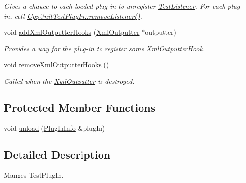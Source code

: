 \begin{DoxyCompactItemize}
\begin{DoxyCompactList}\small\item\em Gives a chance to each loaded plug-\/in to unregister \hyperlink{class_test_listener}{Test\-Listener}. For each plug-\/in, call \hyperlink{struct_cpp_unit_test_plug_in_a8f36157014b515d38efbc8ab67923d85}{Cpp\-Unit\-Test\-Plug\-In\-::remove\-Listener()}. \end{DoxyCompactList}\item 
\hypertarget{class_plug_in_manager_a4a9c64e0ac3f762b100b993d7e33f889}{void \hyperlink{class_plug_in_manager_a4a9c64e0ac3f762b100b993d7e33f889}{add\-Xml\-Outputter\-Hooks} (\hyperlink{class_xml_outputter}{Xml\-Outputter} $\ast$outputter)}\label{class_plug_in_manager_a4a9c64e0ac3f762b100b993d7e33f889}

\begin{DoxyCompactList}\small\item\em Provides a way for the plug-\/in to register some \hyperlink{class_xml_outputter_hook}{Xml\-Outputter\-Hook}. \end{DoxyCompactList}\item 
void \hyperlink{class_plug_in_manager_a0fe59f82fd430ea57159a6ffad9a4035}{remove\-Xml\-Outputter\-Hooks} ()
\begin{DoxyCompactList}\small\item\em Called when the \hyperlink{class_xml_outputter}{Xml\-Outputter} is destroyed. \end{DoxyCompactList}\end{DoxyCompactItemize}
\subsection*{Protected Member Functions}
\begin{DoxyCompactItemize}
\item 
void \hyperlink{class_plug_in_manager_afc1fa045afaac73cd44f69839056f1e1}{unload} (\hyperlink{struct_plug_in_manager_1_1_plug_in_info}{Plug\-In\-Info} \&plug\-In)
\end{DoxyCompactItemize}


\subsection{Detailed Description}
Manges Test\-Plug\-In. 

